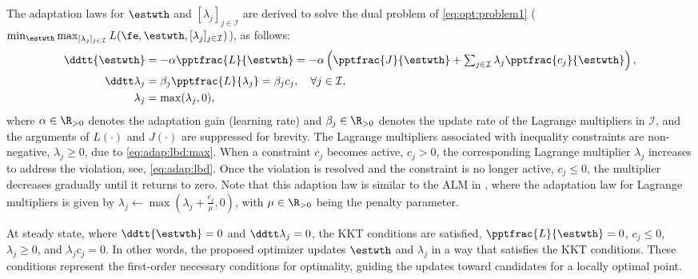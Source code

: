 \documentclass[lettersize,journal]{IEEEtran}
\begin{document}
The adaptation laws for $\estwth$ and $[\lambda_j]_{j\in\mathcal I}$ are derived to solve the dual problem of \eqref{eq:opt:problem1} (\ie  $\min_{\estwth} \max_{[\lambda_j]_{j\in\mathcal I}}L(\fe,\estwth,[\lambda_j]_{j\in\mathcal I})$), as follows:
\begin{subequations}
    \begin{align}
            \ddtt{\estwth}
            &
            =
            -\alpha \pptfrac{L}{\estwth}
            =
            -\alpha 
            \left(
                \pptfrac{J}{\estwth}
                +
                \textstyle\sum_{j\in\mathcal{I}}
                \lambda_j 
                \pptfrac{c_j}{\estwth}
            \right),
        \label{eq:adap:th}
            \\
            \ddtt\lambda_j
            & 
            = 
            \beta_j\pptfrac{L}{\lambda_j} 
            = 
            \beta_j c_j ,
            \quad \forall j\in\mathcal I,
        \label{eq:adap:lbd}
            \\
            \lambda_j & = \max(\lambda_j,0) ,
        \label{eq:adap:lbd:max}
    \end{align}
    \label{eq:adaptation law}%
\end{subequations}
where $\alpha\in\R_{>0}$ denotes the adaptation gain (learning rate) and $\beta_j\in\R_{>0}$ denotes the update rate of the Lagrange multipliers in $\mathcal I$, and the arguments of $L(\cdot)$ and $J(\cdot)$ are suppressed for brevity. 
The Lagrange multipliers associated with inequality constraints are non-negative, \ie $\lambda_j\ge 0$, due to \eqref{eq:adap:lbd:max}. 
When a constraint $c_j$ becomes active, \ie $c_j > 0$, the corresponding Lagrange multiplier $\lambda_j$ increases to address the violation, \ie see, \eqref{eq:adap:lbd}.
Once the violation is resolved and the constraint is no longer active, \ie $c_j \le 0$, the multiplier decreases gradually until it returns to zero.
Note that this adaption law is similar to the ALM in \cite{Nocedal:2006aa}, where the adaptation law for Lagrange multipliers is given by $\lambda_j\leftarrow \max\left(\lambda_j+\tfrac{c_j}{\mu},0\right)$, with $\mu\in\R_{>0}$ being the penalty parameter. 

At steady state, where $\ddtt{\estwth}=0$ and $\ddtt\lambda_j=0$, the KKT conditions are satisfied, \ie $\pptfrac{L}{\estwth}=0$, $c_j \le 0$, $\lambda_j \ge 0$, and $\lambda_j c_j=0$.
In other words, the proposed optimizer updates $\estwth$ and $\lambda_j$ in a way that satisfies the KKT conditions. 
These conditions represent the first-order necessary conditions for optimality, guiding the updates toward candidates for a locally optimal point.
\end{document}
